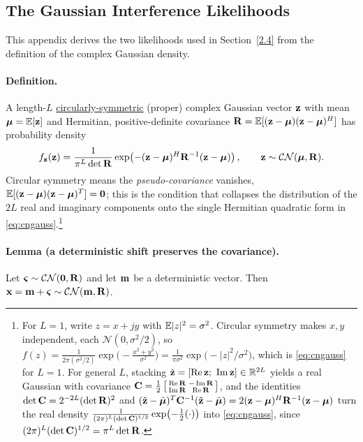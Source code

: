 \documentclass{article}
\begin{document}
\subsection{The Gaussian Interference Likelihoods}
\label{app:gausslik}
This appendix derives the two likelihoods used in Section~\ref{2.4} from the definition of the complex Gaussian density.

\paragraph{Definition.}
A length-$L$ \underline{circularly-symmetric} (proper) complex Gaussian vector $\vb z$ with mean $\boldsymbol{\mu}=\mathbb{E}[\vb z]$ and Hermitian, positive-definite covariance $\mathbf{R}=\mathbb{E}[(\vb z-\boldsymbol{\mu})(\vb z-\boldsymbol{\mu})^H]$ has probability density
\begin{equation}
  f_{\vb z}(\vb z) = \frac{1}{\pi^L\det\mathbf{R}}
    \exp\!\left(-(\vb z-\boldsymbol{\mu})^H\mathbf{R}^{-1}(\vb z-\boldsymbol{\mu})\right),
  \qquad \vb z\sim\mathcal{CN}(\boldsymbol{\mu},\mathbf{R}). \label{eq:cngauss}
\end{equation}
Circular symmetry means the \emph{pseudo-covariance} vanishes,
$\mathbb{E}[(\vb z-\boldsymbol{\mu})(\vb z-\boldsymbol{\mu})^T]=\mathbf{0}$; this is the condition that collapses the
distribution of the $2L$ real and imaginary components onto the single Hermitian
quadratic form in \eqref{eq:cngauss}.\footnote{For $L=1$, write $z=x+jy$ with $\mathbb{E}|z|^2=\sigma^2$. Circular symmetry makes $x,y$ independent, each $\mathcal N(0,\sigma^2/2)$, so $f(z)=\frac{1}{2\pi(\sigma^2/2)}\exp\!\big(-\tfrac{x^2+y^2}{\sigma^2}\big)=\frac{1}{\pi\sigma^2}\exp\!\big(-|z|^2/\sigma^2\big)$, which is \eqref{eq:cngauss} for $L=1$. For general $L$, stacking $\tilde{\vb z}=[\operatorname{Re}\vb z;\ \operatorname{Im}\vb z]\in\mathbb{R}^{2L}$ yields a real Gaussian with covariance $\mathbf{C}=\tfrac12\left[\begin{smallmatrix}\operatorname{Re}\mathbf{R} & -\operatorname{Im}\mathbf{R}\\ \operatorname{Im}\mathbf{R} & \operatorname{Re}\mathbf{R}\end{smallmatrix}\right]$, and the identities $\det\mathbf{C}=2^{-2L}(\det\mathbf{R})^2$ and $(\tilde{\vb z}-\tilde{\boldsymbol{\mu}})^T\mathbf{C}^{-1}(\tilde{\vb z}-\tilde{\boldsymbol{\mu}})=2(\vb z-\boldsymbol{\mu})^H\mathbf{R}^{-1}(\vb z-\boldsymbol{\mu})$ turn the real density $\frac{1}{(2\pi)^L(\det\mathbf{C})^{1/2}}\exp(-\tfrac12(\cdot))$ into \eqref{eq:cngauss}, since $(2\pi)^L(\det\mathbf{C})^{1/2}=\pi^L\det\mathbf{R}$.}

\paragraph{Lemma (a deterministic shift preserves the covariance).}
Let $\boldsymbol{\varsigma}\sim\mathcal{CN}(\vb 0,\mathbf{R})$ and let $\vb m$ be a deterministic vector. Then $\vb x=\vb m+\boldsymbol{\varsigma}\sim\mathcal{CN}(\vb m,\mathbf{R})$.
\end{document}
